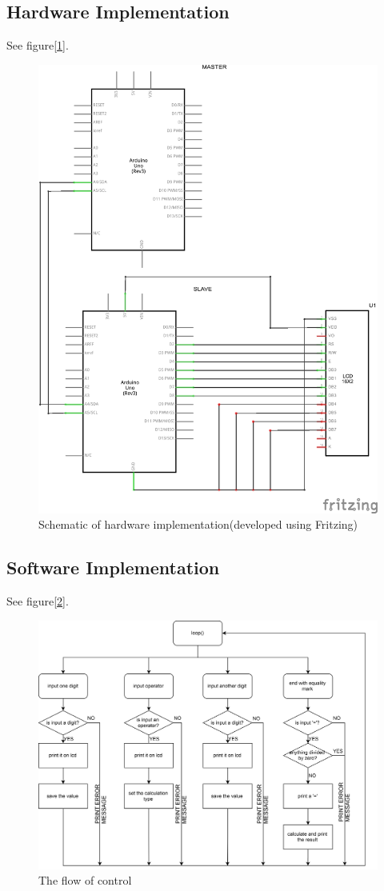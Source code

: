 \subsection{Hardware Implementation}
See figure[\ref{fig:schm}].
\begin{figure}[!htbp]
	\centering
	\includegraphics[width = \linewidth]{images/schem.png}
	\caption{Schematic of hardware implementation(developed using Fritzing)}
	\label{fig:schm}
\end{figure}

\subsection{Software Implementation}
See figure[\ref{fig:flow}].
\begin{figure}[!htbp]
	\centering
	\includegraphics[width = \linewidth]{images/flow_chart.png}
	\caption{The flow of control}
	\label{fig:flow}
\end{figure}